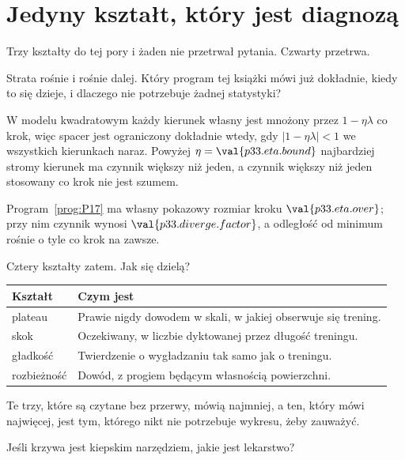 \section{Jedyny kształt, który jest diagnozą}
\label{sec:P33-diverge}

\begin{fr}
Trzy kształty do tej pory i żaden nie przetrwał pytania. Czwarty przetrwa.

Strata rośnie i rośnie dalej. Który program tej książki mówi już dokładnie,
kiedy to się dzieje, i dlaczego nie potrzebuje żadnej statystyki?
\dotline
\nextframe
\end{fr}

\begin{fr}
\begin{ansblock}
W modelu kwadratowym każdy kierunek własny jest mnożony przez
$1 - \eta\lambda$ co krok, więc spacer jest ograniczony dokładnie wtedy, gdy
$\lvert 1 - \eta\lambda \rvert < 1$ we wszystkich kierunkach naraz. Powyżej
$\eta = \val{p33.eta.bound}$ najbardziej stromy kierunek ma czynnik większy
niż jeden, a czynnik większy niż jeden stosowany co krok nie jest szumem.
\end{ansblock}

Program~\ref{prog:P17} ma własny pokazowy rozmiar kroku
$\val{p33.eta.over}$; przy nim czynnik wynosi $\val{p33.diverge.factor}$, a
odległość od minimum rośnie o tyle co krok na zawsze.

Cztery kształty zatem. Jak się dzielą?
\dotline
\nextframe
\end{fr}

\begin{fr}

\begin{center}
\begin{tabularx}{\linewidth}{@{}lX@{}}
\toprule
\textbf{Kształt} & \textbf{Czym jest} \\
\midrule
plateau & Prawie nigdy dowodem w skali, w jakiej obserwuje się trening. \\
skok & Oczekiwany, w liczbie dyktowanej przez długość treningu. \\
gładkość & Twierdzenie o wygładzaniu tak samo jak o treningu. \\
rozbieżność & Dowód, z progiem będącym własnością powierzchni. \\
\bottomrule
\end{tabularx}
\end{center}

Te trzy, które są czytane bez przerwy, mówią najmniej, a ten, który mówi
najwięcej, jest tym, którego nikt nie potrzebuje wykresu, żeby zauważyć.

Jeśli krzywa jest kiepskim narzędziem, jakie jest lekarstwo?
\dotline
\nextframe
\end{fr}

